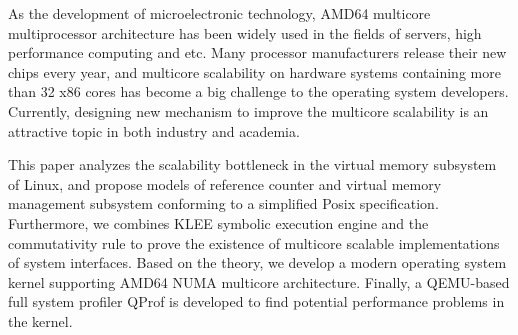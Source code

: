 
\begin{eabstract} 
	
	As the development of microelectronic technology, AMD64 multicore multiprocessor architecture has been widely used in the fields of servers, high performance
	computing and etc. Many processor manufacturers release their new chips every year, and multicore scalability on hardware systems containing more than 32 x86 cores has become a big challenge to the operating system developers. Currently,  designing new mechanism to improve the multicore scalability is an attractive 
	topic in both industry and academia.
	
	This paper analyzes the scalability bottleneck in the virtual memory subsystem of Linux, and propose models of reference counter and virtual memory management
	subsystem conforming to a simplified Posix specification. Furthermore, we combines KLEE symbolic execution engine and the commutativity rule 
	to prove the existence of multicore scalable implementations of system interfaces. Based on the theory, we develop a modern operating system kernel supporting
	AMD64 NUMA multicore  architecture. Finally, a QEMU-based full system profiler QProf is developed to find potential performance problems in the kernel.
\end{eabstract}

